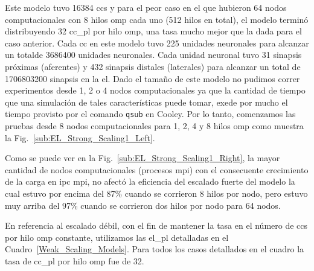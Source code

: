 {Este modelo tuvo 16384 \glspl{cc} y para el peor caso en el que hubieron 64 nodos computacionales con 8 hilos \gls{omp} cada uno (512 hilos en total), el modelo terminó distribuyendo 32 \gls{cc_pl} por hilo \gls{omp}, una tasa mucho mejor que la dada para el caso anterior.
Cada \gls{cc} en este modelo tuvo 225 unidades neuronales para alcanzar un totalde 3686400 unidades neuronales.
Cada unidad neuronal tuvo 31 sinapsis próximas (aferentes) y 432 sinapsis distales (laterales) para alcanzar un total de 1706803200 sinapsis en la \gls{el}.
Dado el tamaño de este modelo no pudimos correr experimentos desde 1, 2 o 4 nodos computacionales ya que la cantidad de tiempo que una simulación de tales características puede tomar, exede por mucho el tiempo provisto por el comando \texttt{qsub} en Cooley.
Por lo tanto, comenzamos las pruebas desde 8 nodos computacionales para  1, 2, 4 y 8 hilos \gls{omp} como muestra la Fig.~\ref{sub:EL_Strong_Scaling1_Left}.

Como se puede ver en la Fig.~\ref{sub:EL_Strong_Scaling1_Right}, la mayor cantidad de nodos computacionales (procesos \gls{mpi}) con el consecuente crecimiento de la carga en \gls{ipc} \gls{mpi}, no afectó la eficiencia del escalado fuerte del modelo la cual estuvo por encima del 87\% cuando se corrieron 8 hilos por nodo, pero estuvo muy arriba del 97\% cuando se corrieron dos hilos por nodo para 64 nodos. 

En referencia al escalado débil, con el fin de mantener la tasa en el número de \glspl{cc} por hilo \gls{omp} constante, utilizamos las \gls{el_pl} detalladas en el Cuadro~\ref{Weak_Scaling_Models}.
Para todos los casos detallados en el cuadro la tasa de \gls{cc_pl} por hilo \gls{omp} fue de 32.

}
